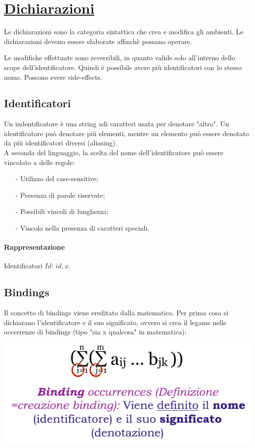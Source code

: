 \documentclass[a4paper, 10pt]{report}
\begin{document}
\section*{\underline{Dichiarazioni}}
Le dichiarazioni sono la categoria sintattica che crea e modifica gli ambienti. Le dichiarazioni devono essere elaborate affinchè possano operare. 

Le modifiche effettuate sono reversibili, in quanto valide solo all'interno dello scope dell'identificatore. Quindi è possibile avere più identificatori con lo stesso nome. Possono evere side-effects.

\subsection*{Identificatori}
Un indentificatore è una string adi caratteri usata per denotare "altro". 
Un identificatore può denotare più elementi, mentre un elemento può essere denotato da più identificatori diversi (aliasing).\\

\noindent A seconda del linguaggio, la scelta del nome dell'identificatore può essere vincolato a delle regole:
\begin{itemize}
\item[-] Utilizzo del case-sensitive;
\item[-] Presenza di parole riservate;
\item[-] Possibili vincoli di lunghezza;
\item[-] Vincolo nella presenza di caratteri speciali.
\end{itemize}

\paragraph*{Rappresentazione} Identificatori $Id$: $id, x$.

\subsection*{Bindings}
Il concetto di bindings viene ereditato dalla matematica.
Per prima cosa si dichiarano l'identificatore e il suo significato, ovvero si crea il legame nelle occerrenze di bindings (tipo "sia x qualcosa" in matematica):
\begin{center}
\includegraphics[scale=0.7]{1.pdf}
\end{center}
\end{document}

